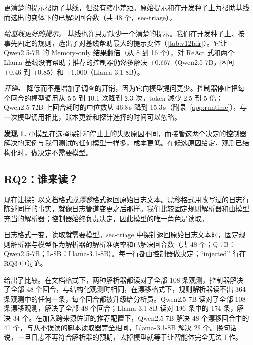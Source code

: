 \begin{table}[t]
  \caption{更清楚的提示帮助了基线，但没有缩小差距。原始提示和在开发种子上为帮助基线而选出的变体下的已解决回合数（共 48 个，sec-triage）。}
  \label{tab:v12fair}
  \centering\small
  \begin{adjustbox}{max width=\columnwidth}\end{adjustbox}
\end{table}

\emph{给基线更好的提示。} 基线也许只是缺少一个清楚的提示。我们在开发种子上、按事先固定的规则，选出了对基线帮助最大的提示变体（\cref{tab:v12fair}）。它让 Qwen2.5-7B 的 Memory-only 结果翻倍（从 8 到 16 个），对 ReAct 式和两个 Llama 基线没有帮助；推荐的控制器仍然多解决 $+0.667$（Qwen2.5-7B，区间 $+0.46$ 到 $+0.85$）和 $+1.000$（Llama-3.1-8B）。

\emph{开销。} \hesp{} 降低而不是增加了调查的开销，因为它向模型提问更少。控制器停止把每个回合的模型调用从 5.5 到 10.1 次降到 2.3 次，token 减少 2.5 到 5 倍；Qwen2.5-72B 上回合耗时的中位数从 46.8\,s 降到 15.3\,s（附录~\ref{app:runtime}）。与一次模型调用相比，账本更新和探针选择的时间可以忽略。

\smallskip\noindent\textbf{发现 1.} 小模型在选择探针和停止上的失败原因不同，而接管这两个决定的控制器解决的案例与我们测试的任何模型一样多，成本更低。在候选原因给定、观测已结构化时，做决定不需要模型。


\subsection{RQ2：谁来读？}
\label{sec:read}
现在让探针以文档格式或\emph{漂移}格式返回原始日志文本。漂移格式用改写过的日志行陈述同样的事实，就像日志管道变更之后那样。我们比较固定规则解析器和由模型充当的解析器；控制器始终负责决定，因此模型的唯一角色是读取。

\begin{table}[t]
  \caption{日志格式一变，读取就需要模型。sec-triage 中探针返回原始日志文本时，固定规则解析器与模型作为解析器的解析准确率和已解决回合数（共 48 个；Q-7B：Qwen2.5-7B；L-8B：Llama-3.1-8B）。每一行都由控制器做决定；``injected'' 行在 RQ3 中讨论。}
  \label{tab:v12raw}
  \centering\small
  \begin{adjustbox}{max width=\columnwidth}\end{adjustbox}
\end{table}

 给出了比较。在文档格式下，两种解析器都读对了全部 108 条观测，控制器解决了全部 48 个回合，与结构化观测时相同。在漂移格式下，规则解析器读不出 364 条观测中的任何一条，每个回合都被升级给分析员。Qwen2.5-7B 读对了全部 108 条漂移观测，解决了全部 48 个回合；Llama-3.1-8B 读对 196 条中的 174 条，解决 34 个。在加入跨来源佐证的推荐配置下，Qwen2.5-7B 解决 48 个漂移回合中的 41 个，与从不误读的脚本读取器完全相同，Llama-3.1-8B 解决 28 个。换句话说，一旦日志不再符合解析器的预期，去掉模型就等于让智能体完全无法工作。

